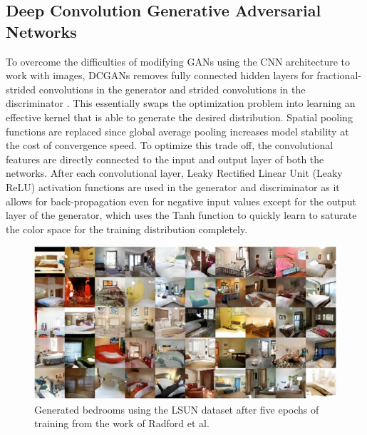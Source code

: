 \documentclass{Configuration_Files/PoliMi3i_thesis}
\begin{document}
\subsection{Deep Convolution Generative Adversarial Networks}
To overcome the difficulties of modifying GANs using the CNN architecture to work 
with images, DCGANs removes fully connected hidden 
layers for fractional-strided convolutions in the generator and strided convolutions 
in the discriminator \cite{AlR16}. This essentially swaps the optimization problem into learning 
an effective kernel that is able to generate the desired distribution. Spatial pooling 
functions are replaced since global average pooling increases model stability at the 
cost of convergence speed. To optimize this trade off, the convolutional features are 
directly connected to the input and output layer of both the networks. After each 
convolutional layer, Leaky Rectified Linear Unit (Leaky ReLU) activation functions are used in the 
generator and discriminator as it allows for back-propagation even for negative input 
values except for the output layer of the generator, which uses the Tanh function to 
quickly learn to saturate the color space for the training distribution completely.
\begin{figure}[H]
    \centering
    \includegraphics[width=1\textwidth]{dcgan_results.jpg}
    \caption[Generated bedrooms from the work of Radford et al.]
{Generated bedrooms using the LSUN dataset after five epochs of training from the work of Radford et al.}
    \label{fig:dcganresults}
\end{figure}
\newpage
\end{document}
